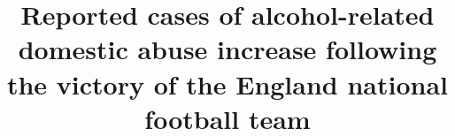 \documentclass[12pt, letterpaper]{article}
\begin{document}
\title{Reported cases of alcohol-related domestic abuse increase following the victory of the England national football team}
\date{}
\maketitle


%



\end{document}
